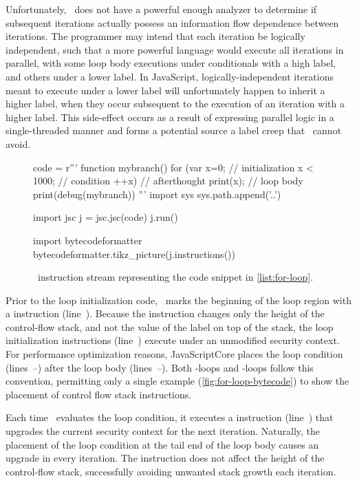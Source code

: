 Unfortunately, \FlowCore\ does not have a powerful enough analyzer to determine if subsequent iterations actually possess an information flow dependence between iterations.
The programmer may intend that each iteration be logically independent, such that a more powerful language would execute all iterations in parallel, with some loop body executions under conditionals with a high label, and others under a lower label.
In JavaScript, logically-independent iterations meant to execute under a lower label will unfortunately happen to inherit a higher label, when they occur subsequent to the execution of an iteration with a higher label.
This side-effect occurs as a result of expressing parallel logic in a single-threaded manner and forms a potential source a label creep that \FlowCore\ cannot avoid.

\begin{figure}[h]
\begin{python}
code = r'''
function mybranch() {
  for (var x=0;      // initialization
       x < 1000;     // condition
       ++x) {        // afterthought
    print(x);        // loop body
  }
}
print(debug(mybranch))
'''
import sys
sys.path.append('..')

import jsc
j = jsc.jsc(code)
j.run()

import bytecodeformatter
bytecodeformatter.tikz_picture(j.instructions())
\end{python}
  \caption{\FlowCore\ instruction stream representing the code snippet in \autoref{list:for-loop}.}
  \label{fig:for-loop-bytecode}
\end{figure}

Prior to the loop initialization code, \FlowCore\ marks the beginning of the loop region with a \dup instruction (line~).
Because the \dup instruction changes only the height of the control-flow stack, and not the value of the label on top of the stack, the loop initialization instructions (line~) execute under an unmodified security context.
For performance optimization reasons, JavaScriptCore places the loop condition (lines~--) after the loop body (lines~--).
Both -loops and -loops follow this convention, permitting only a single example (\autoref{fig:for-loop-bytecode}) to show the placement of control flow stack instructions.

Each time \FlowCore\ evaluates the loop condition, it executes a \join instruction (line~) that upgrades the current security context for the next iteration.
Naturally, the placement of the loop condition at the tail end of the loop body causes an upgrade in every iteration.
The \join instruction does not affect the height of the control-flow stack, successfully avoiding unwanted stack growth each iteration.


